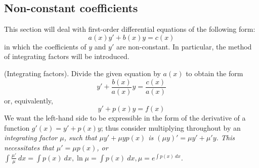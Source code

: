 \documentclass{article}
\begin{document}
\subsection{Non-constant coefficients}
This section will deal with first-order differential equations of the following form:
\begin{equation*}
    a(x)y' + b(x)y = c(x)
\end{equation*}
in which the coefficients of $y$ and $y'$ are non-constant. In particular, the method of integrating factors will be introduced.
\begin{method}
    (Integrating factors). Divide the given equation by $a(x)$ to obtain the form
\begin{equation*}
    y' + \frac{b(x)}{a(x)}y = \frac{c(x)}{a(x)}
\end{equation*}
or, equivalently, 
\begin{equation*}
    y' + p(x)y = f(x)
\end{equation*}
We want the left-hand side to be expressible in the form of the derivative of a function $g'(x) = y' + p(x)y$; thus consider multiplying throughout by an \it integrating factor \normalfont $\mu$, such that $\mu y' + \mu y p(x)$ is $(\mu y)' = \mu y' + \mu' y$. This necessitates that $\mu' = \mu p(x)$, or $\int \frac{\mu'}{\mu} \ dx = \int p(x)\ dx, \ln \mu = \int p(x)\ dx, \mu = e^{\int p(x)\ dx}$. 
\end{method}
\end{document}

